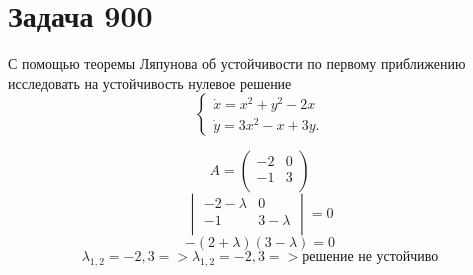\section*{Задача 900}
С помощью теоремы Ляпунова об устойчивости по первому приближению исследовать на устойчивость нулевое решение
$$\begin{cases}
\dot{x} = x^2 + y^2 - 2x \\
\dot{y} = 3x^2 - x + 3y.
\end{cases}
$$

\begin{solution}
   $$ A = \begin{pmatrix}
      -2 & 0 \\
      -1 & 3 \\
   \end{pmatrix} $$
   $$\begin{vmatrix}
    -2 - \lambda & 0 \\ 
    -1 & 3 - \lambda \\
   \end{vmatrix} = 0$$
   $$ -(2 + \lambda)(3 - \lambda) = 0   $$
   $$\lambda_{1, 2} = -2, 3 => \lambda_{1,2} = -2, 3 => \text{решение не устойчиво} $$

\end{solution}


